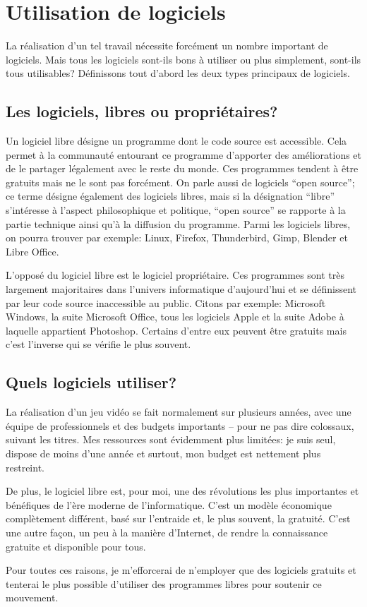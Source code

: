 \section{Utilisation de logiciels}

La réalisation d'un tel travail nécessite forcément un nombre important de logiciels. Mais tous les logiciels sont-ils bons à utiliser ou plus simplement, sont-ils tous utilisables? Définissons tout d'abord les deux types principaux de logiciels.

\subsection{Les logiciels, libres ou propriétaires?}
Un logiciel libre désigne un programme dont le code source est accessible. Cela permet à la communauté entourant ce programme d'apporter des améliorations et de le partager légalement avec le reste du monde. Ces programmes tendent à être gratuits mais ne le sont pas forcément. On parle aussi de logiciels \enquote{open source}; ce terme désigne également des logiciels libres, mais si la désignation \enquote{libre} s'intéresse à l'aspect philosophique et politique, \enquote{open source} se rapporte à la partie technique ainsi qu'à la diffusion du programme. Parmi les logiciels libres, on pourra trouver par exemple: Linux, Firefox, Thunderbird, Gimp, Blender et Libre Office.\cite{Logiciellibre_}\cite{Opensource_}

L'opposé du logiciel libre est le logiciel propriétaire. Ces programmes sont très largement majoritaires dans l'univers informatique d'aujourd'hui et se définissent par leur code source inaccessible au public. Citons par exemple: Microsoft Windows, la suite Microsoft Office, tous les logiciels Apple et la suite Adobe à laquelle appartient Photoshop. Certains d'entre eux peuvent être gratuits mais c'est l'inverse qui se vérifie le plus souvent.

\subsection{Quels logiciels utiliser?}
La réalisation d'un jeu vidéo se fait normalement sur plusieurs années, avec une équipe de professionnels et des budgets importants -- pour ne pas dire colossaux, suivant les titres. Mes ressources sont évidemment plus limitées: je suis seul, dispose de moins d'une année et surtout, mon budget est nettement plus restreint.

De plus, le logiciel libre est, pour moi, une des révolutions les plus importantes et bénéfiques de l'ère moderne de l'informatique. C'est un modèle économique complètement différent, basé sur l'entraide et, le plus souvent, la gratuité. C'est une autre façon, un peu à la manière d'Internet, de rendre la connaissance gratuite et disponible pour tous.

Pour toutes ces raisons, je m'efforcerai de n'employer que des logiciels gratuits et tenterai le plus possible d'utiliser des programmes libres pour soutenir ce mouvement.
